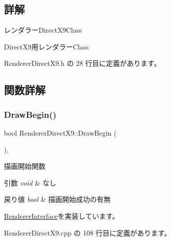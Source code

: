 \subsection{詳解}
レンダラー\+Direct\+X9\+Class 

Direct\+X9用レンダラー\+Class 

 Renderer\+Direct\+X9.\+h の 28 行目に定義があります。



\subsection{関数詳解}
\mbox{\label{class_renderer_direct_x9_a5113bf4e6aefdb7bcab2016fbbee0174}} 
\subsubsection{\texorpdfstring{Draw\+Begin()}{DrawBegin()}}
{\footnotesize\ttfamily bool Renderer\+Direct\+X9\+::\+Draw\+Begin (\begin{DoxyParamCaption}{ }\end{DoxyParamCaption})\hspace{0.3cm}{\ttfamily [override]}, {\ttfamily [virtual]}}



描画開始関数 


\begin{DoxyParams}{引数}
{\em void} & なし \\
\hline
\end{DoxyParams}

\begin{DoxyRetVals}{戻り値}
{\em bool} & 描画開始成功の有無 \\
\hline
\end{DoxyRetVals}


\mbox{\hyperlink{class_renderer_interface_a86a487deb4e4207a67410d00ec670fd7}{Renderer\+Interface}}を実装しています。



 Renderer\+Direct\+X9.\+cpp の 108 行目に定義があります。

\mbox{\label{class_renderer_direct_x9_a5f934597020f77dc9cf729acfb13a830}} 
